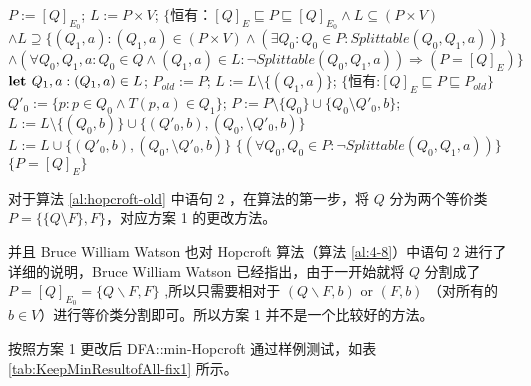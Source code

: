 \begin{algorithm}
    \caption{ \cite{watson1993taxonomyb} }\label{al:hopcroft-old}
    \small%
    \begin{algorithmic}[1]
        \State $P:=[Q]_{E_0}$;
        \State $L:=P\times V$;
        \State $\{ \mbox{恒有：} [Q]_E \sqsubseteq P \sqsubseteq [Q]_{E_0} \land L \subseteq (P \times V) $
        \State \quad $ \land L \supseteq  \{ (Q_1,a) : (Q_1,a) \in (P \times V) \land ( \exists Q_0 : Q_0 \in P : Splittable (Q_0,Q_1,a) ) \} $
        \State \quad $ \land (\forall Q_0,Q_1,a:Q_0 \in Q \land (Q_1,a) \in L : \neg Splittable (Q_0,Q_1,a)) \Rightarrow (P=[Q]_E) \} $
            \State $ \mbox{\textbf{let }} Q_1,a:(Q_1,a) \in L $;
            \State $ P_{old} := P $;
            \State $ L := L \setminus \{ (Q_1,a) \} $;
            \State $ \{ \mbox{恒有:} [Q]_E \sqsubseteq P \sqsubseteq P_{old} \} $
                \State $ Q'_0 := \{ p:p \in Q_0 \land T(p,a) \in Q_1 \} $;
                \State $ P:= P \setminus \{ Q_0 \} \cup \{ Q_0 \setminus Q'_0,b \} $;
                       $ L := L \setminus \{ (Q_0,b) \} \cup \{ (Q'_0,b),(Q_0, \setminus Q'_0,b ) \} $
                        $ L := L \cup \{ (Q'_0,b),(Q_0, \setminus Q'_0,b ) \}$
                    \EndIf
                \EndFor
            \EndFor
            \State $ \{ (\forall Q_0,Q_0 \in P : \neg Splittable(Q_0,Q_1,a)) \} $
        \Until $\{ P = [Q]_E \}$
    \end{algorithmic}
\end{algorithm}

\begin{remark}
    对于算法 \ref{al:hopcroft-old} 中语句 2 ，在算法的第一步，将 $Q$ 分为两个等价类 $ P = \{ \{Q\setminus F\}, F \}$，对应方案 1 的更改方法。
\end{remark}

并且 Bruce William Watson 也对 Hopcroft 算法（算法 \ref{al:4-8}）中语句 2 进行了详细的说明，Bruce William Watson 已经指出，由于一开始就将 $Q$ 分割成了 $P=[Q]_{E_{0}}=\{Q \backslash F, F\}$ ,所以只需要相对于 $(Q \backslash F, b)$ or $(F, b)$ （对所有的 $b \in V $）进行等价类分割即可\cite{Hopc71,watson1993taxonomyb}。所以方案 1 并不是一个比较好的方法。

按照方案 1 更改后 DFA::min-Hopcroft 通过样例测试，如表 \ref{tab:KeepMinResultofAll-fix1} 所示。

